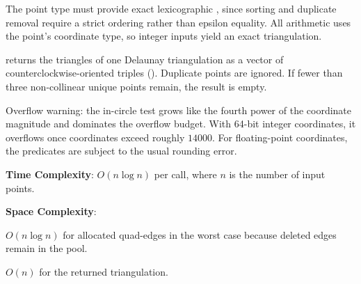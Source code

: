 The point type must provide exact lexicographic , since sorting and duplicate removal require a strict ordering rather than epsilon equality. All arithmetic uses the point's coordinate type, so integer inputs yield an exact triangulation.

\begin{compactitem}
  \item {} returns the triangles of one Delaunay triangulation as a vector of counterclockwise-oriented  triples (). Duplicate points are ignored. If fewer than three non-collinear unique points remain, the result is empty.
\end{compactitem}

Overflow warning: the in-circle test grows like the fourth power of the coordinate magnitude and dominates the overflow budget. With 64-bit integer coordinates, it overflows once coordinates exceed roughly $14000$. For floating-point coordinates, the predicates are subject to the usual rounding error.

\textbf{Time Complexity}: $O(n \log n)$ per call, where $n$ is the number of input points.

\textbf{Space Complexity}:
\begin{compactitem}
  \item $O(n \log n)$ for allocated quad-edges in the worst case because deleted edges remain in the pool.
  \item $O(n)$ for the returned triangulation.
\end{compactitem}

